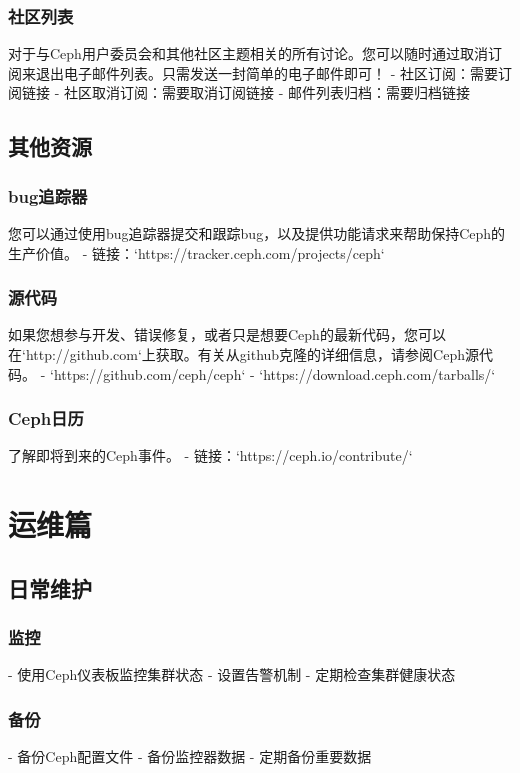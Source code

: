 \documentclass[12pt,UTF8]{ctexbook}
\begin{document}
\subsection{社区列表}
对于与Ceph用户委员会和其他社区主题相关的所有讨论。您可以随时通过取消订阅来退出电子邮件列表。只需发送一封简单的电子邮件即可！
- 社区订阅：需要订阅链接
- 社区取消订阅：需要取消订阅链接
- 邮件列表归档：需要归档链接

\section{其他资源}

\subsection{bug追踪器}
您可以通过使用bug追踪器提交和跟踪bug，以及提供功能请求来帮助保持Ceph的生产价值。
- 链接：`https://tracker.ceph.com/projects/ceph`

\subsection{源代码}
如果您想参与开发、错误修复，或者只是想要Ceph的最新代码，您可以在`http://github.com`上获取。有关从github克隆的详细信息，请参阅Ceph源代码。
- `https://github.com/ceph/ceph`
- `https://download.ceph.com/tarballs/`

\subsection{Ceph日历}
了解即将到来的Ceph事件。
- 链接：`https://ceph.io/contribute/`

\chapter{运维篇}
\section{日常维护}

\subsection{监控}
- 使用Ceph仪表板监控集群状态
- 设置告警机制
- 定期检查集群健康状态

\subsection{备份}
- 备份Ceph配置文件
- 备份监控器数据
- 定期备份重要数据
\end{document}
